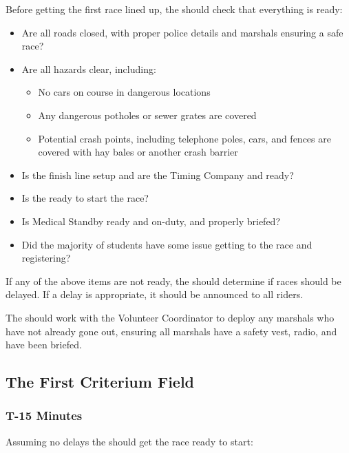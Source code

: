 Before getting the first race lined up, the  should check that everything is ready:

\begin{itemize}
  \item Are all roads closed, with proper police details and marshals ensuring a safe race?
  \item Are all hazards clear, including:
  \begin{itemize}
    \item No cars on course in dangerous locations
    \item Any dangerous potholes or sewer grates are covered
    \item Potential crash points, including telephone poles, cars, and fences are covered with hay bales or another crash barrier
  \end{itemize}
  \item Is the finish line setup and are the Timing Company and  ready?
  \item Is the  ready to start the race?
  \item Is Medical Standby ready and on-duty, and properly briefed?
  \item Did the majority of students have some issue getting to the race and registering?
\end{itemize}

If any of the above items are not ready, the  should determine if races should be delayed.
If a delay is appropriate, it should be announced to all riders.

The  should work with the Volunteer Coordinator to deploy any marshals who have not already gone out,
ensuring all marshals have a safety vest, radio, and have been briefed.

\subsection[First Criterium Field]{The First Criterium Field}

\subsubsection{T-15 Minutes}

Assuming no delays%
the  should get the race ready to start:

